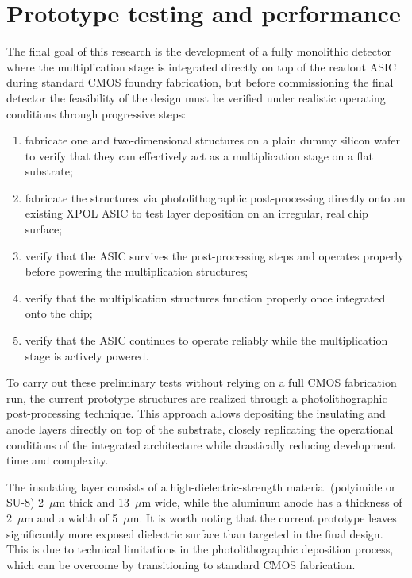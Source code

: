 \section{Prototype testing and performance}

The final goal of this research is the development of a fully monolithic detector where the multiplication stage is integrated directly on top of the readout ASIC during standard CMOS foundry fabrication, but before commissioning the final detector the feasibility of the design must be verified under realistic operating conditions through progressive steps:

\begin{enumerate}
\item fabricate one and two-dimensional structures on a plain dummy silicon wafer to verify that they can effectively act as a multiplication stage on a flat substrate;
\item fabricate the structures via photolithographic post-processing directly onto an existing XPOL ASIC to test layer deposition on an irregular, real chip surface;
\item verify that the ASIC survives the post-processing steps and operates properly before powering the multiplication structures;
\item verify that the multiplication structures function properly once integrated onto the chip;
\item verify that the ASIC continues to operate reliably while the multiplication stage is actively powered.
\end{enumerate}

To carry out these preliminary tests without relying on a full CMOS fabrication run, the current prototype structures are realized through a photolithographic post-processing technique. This approach allows depositing the insulating and anode layers directly on top of the substrate, closely replicating the operational conditions of the integrated architecture while drastically reducing development time and complexity.

The insulating layer consists of a high-dielectric-strength material (polyimide or SU-8) 2~$\mu$m thick and 13~$\mu$m wide, while the aluminum anode has a thickness of 2~$\mu$m and a width of 5~$\mu$m. It is worth noting that the current prototype leaves significantly more exposed dielectric surface than targeted in the final design. This is due to technical limitations in the photolithographic deposition process, which can be overcome by transitioning to standard CMOS fabrication.

